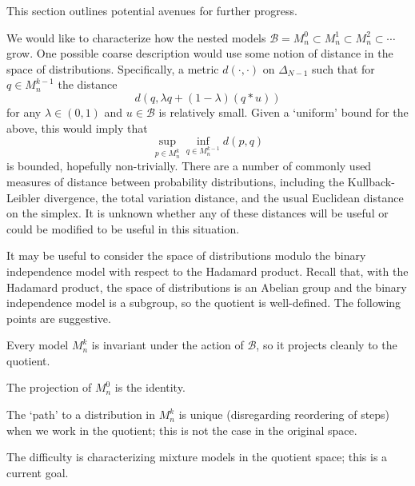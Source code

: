 \documentclass[11pt,titlepage]{article}
\newcommand*{\Bin}{\mathcal{B}}
\numberwithin{equation}{section}
\begin{document}
    This section outlines potential avenues for further progress.

    We would like to characterize how the nested models $\Bin = M_n^0 \subset
    M_n^1 \subset M_n^2 \subset \cdots$ grow.  One possible coarse description
    would use some notion of distance in the space of distributions.
    Specifically, a metric $d(\cdot, \cdot)$ on $\Delta_{N-1}$ such that for $q
    \in M_n^{k-1}$ the distance
    \[
        d(q, \lambda q + (1 - \lambda)(q * u))
    \]
    for any $\lambda \in (0,1)$ and $u \in \Bin$ is relatively small.  Given a
    `uniform' bound for the above, this would imply that
    \[
        \sup_{p \in M_n^k}
        \inf_{q \in M_n^{k-1}} d(p, q)
    \]
    is bounded, hopefully non-trivially.  There are a number of commonly used
    measures of distance between probability distributions, including the
    Kullback-Leibler divergence, the total variation distance, and the usual
    Euclidean distance on the simplex.  It is unknown whether any of these
    distances will be useful or could be modified to be useful in this
    situation.

    It may be useful to consider the space of distributions modulo the binary
    independence model with respect to the Hadamard product.  Recall that, with
    the Hadamard product, the space of distributions is an Abelian group and the
    binary independence model is a subgroup, so the quotient is well-defined.
    The following points are suggestive.
    \begin{itemize*}
        \item Every model $M_n^k$ is invariant under the action of $\Bin$, so
        it projects cleanly to the quotient.
        \item The projection of $M_n^0$ is the identity.
        \item The `path' to a distribution in $M_n^k$ is unique (disregarding
        reordering of steps) when we work in the quotient; this is not the case
        in the original space.
    \end{itemize*}
    The difficulty is characterizing mixture models in the quotient space; this
    is a current goal.
    

\end{document}
